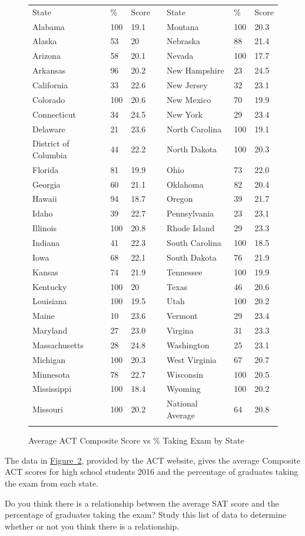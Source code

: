 \documentclass[10pt,]{book}
\theoremstyle{ptxdefinitionnotitle}
\theoremstyle{ptxdefinitiontitle}
\numberwithin{equation}{section}
\newcommand{\hrulemedium}{\noalign{\hrule height 0.07em}}
\begin{document}
\begin{example}\label{example-2}
\leavevmode%
\begin{figure}
\centering
\begin{tabular}{lllllll}\hrulemedium
State&\%&Score&&State&\%&Score\tabularnewline\hrulemedium
Alabama&100&19.1&&Montana&100&20.3\tabularnewline\hrulemedium
Alaska&53&20&&Nebraska&88&21.4\tabularnewline\hrulemedium
Arizona&58&20.1&&Nevada&100&17.7\tabularnewline\hrulemedium
Arkansas&96&20.2&&New Hampshire&23&24.5\tabularnewline\hrulemedium
California&33&22.6&&New Jersey&32&23.1\tabularnewline\hrulemedium
Colorado&100&20.6&&New Mexico&70&19.9\tabularnewline\hrulemedium
Connecticut&34&24.5&&New York&29&23.4\tabularnewline\hrulemedium
Delaware&21&23.6&&North Carolina&100&19.1\tabularnewline\hrulemedium
District of Columbia&44&22.2&&North Dakota&100&20.3\tabularnewline\hrulemedium
Florida&81&19.9&&Ohio&73&22.0\tabularnewline\hrulemedium
Georgia&60&21.1&&Oklahoma&82&20.4\tabularnewline\hrulemedium
Hawaii&94&18.7&&Oregon&39&21.7\tabularnewline\hrulemedium
Idaho&39&22.7&&Pennsylvania&23&23.1\tabularnewline\hrulemedium
Illinois&100&20.8&&Rhode Island&29&23.3\tabularnewline\hrulemedium
Indiana&41&22.3&&South Carolina&100&18.5\tabularnewline\hrulemedium
Iowa&68&22.1&&South Dakota&76&21.9\tabularnewline\hrulemedium
Kansas&74&21.9&&Tennessee&100&19.9\tabularnewline\hrulemedium
Kentucky&100&20&&Texas&46&20.6\tabularnewline\hrulemedium
Louisiana&100&19.5&&Utah&100&20.2\tabularnewline\hrulemedium
Maine&10&23.6&&Vermont&29&23.4\tabularnewline\hrulemedium
Maryland&27&23.0&&Virgina&31&23.3\tabularnewline\hrulemedium
Massachusetts&28&24.8&&Washington&25&23.1\tabularnewline\hrulemedium
Michigan&100&20.3&&West Virginia&67&20.7\tabularnewline\hrulemedium
Minnesota&78&22.7&&Wisconsin&100&20.5\tabularnewline\hrulemedium
Mississippi&100&18.4&&Wyoming&100&20.2\tabularnewline\hrulemedium
Missouri&100&20.2&&National Average&64&20.8\tabularnewline\hrulemedium
\end{tabular}
\caption{Average ACT Composite Score vs \% Taking Exam by State\label{avg-act-score}}
\end{figure}
\hypertarget{p-81}{}%
The data in \hyperref[avg-act-score]{Figure~2}, provided by the ACT website, gives the average Composite ACT scores for high school students 2016 and the percentage of graduates taking the exam from each state. \\%
\par
\hypertarget{p-82}{}%
Do you think there is a relationship between the average SAT score and the percentage of graduates taking the exam? Study this list of data to determine whether or not you think there is a relationship. \\%

\end{example}
\end{document}

